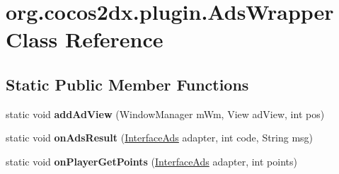 \hypertarget{classorg_1_1cocos2dx_1_1plugin_1_1AdsWrapper}{}\section{org.\+cocos2dx.\+plugin.\+Ads\+Wrapper Class Reference}
\label{classorg_1_1cocos2dx_1_1plugin_1_1AdsWrapper}
\subsection*{Static Public Member Functions}
\begin{DoxyCompactItemize}
\item 
\mbox{\label{classorg_1_1cocos2dx_1_1plugin_1_1AdsWrapper_a4070332786d53717e229579ed7065da5}} 
static void {\bfseries add\+Ad\+View} (Window\+Manager m\+Wm, View ad\+View, int pos)
\item 
\mbox{\label{classorg_1_1cocos2dx_1_1plugin_1_1AdsWrapper_a526a3b8777786cb08ab63ea3047bbd92}} 
static void {\bfseries on\+Ads\+Result} (\hyperlink{interfaceorg_1_1cocos2dx_1_1plugin_1_1InterfaceAds}{Interface\+Ads} adapter, int code, String msg)
\item 
\mbox{\label{classorg_1_1cocos2dx_1_1plugin_1_1AdsWrapper_ad74e3b698a7167ca7af6f8f1ab0c6e10}} 
static void {\bfseries on\+Player\+Get\+Points} (\hyperlink{interfaceorg_1_1cocos2dx_1_1plugin_1_1InterfaceAds}{Interface\+Ads} adapter, int points)
\end{DoxyCompactItemize}
